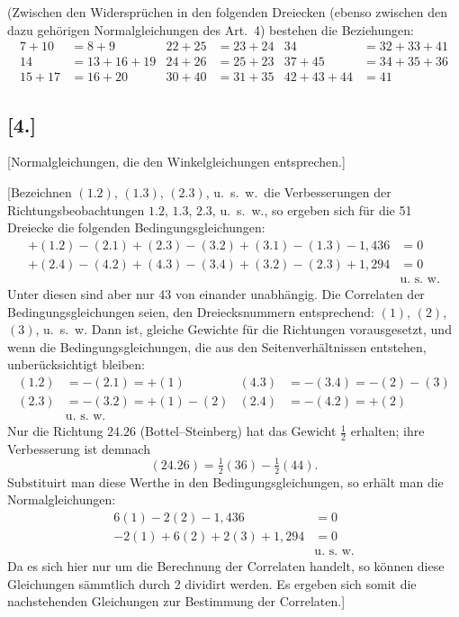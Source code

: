 \documentclass[12pt,a4paper]{article}
\theoremstyle{plain}
\theoremstyle{definition}
\theoremstyle{remark}
\begin{document}
(Zwischen den Widerspr\"uchen in den folgenden Dreiecken (ebenso zwischen den dazu geh\"origen Normalgleichungen des Art.\ 4) bestehen die Beziehungen:
\begin{align*}
7 + 10 &= 8 + 9 & 22 + 25 &= 23 + 24 & 34 &= 32 + 33 + 41\\
14 &= 13 + 16 + 19 & 24 + 26 &= 25 + 23 & 37 + 45 &= 34 + 35 + 36\\
15 + 17 &= 16 + 20 & 30 + 40 &= 31 + 35 & 42 + 43 + 44 &= 41
\end{align*}
\newpage
\subsection*{[4.]}
\label{subsec:netz4}

[Normalgleichungen, die den Winkelgleichungen entsprechen.]

[Bezeichnen $(1.2)$, $(1.3)$, $(2.3)$, u.\ s.\ w.\ die Verbesserungen der Richtungsbeobachtungen $1.2$, $1.3$, $2.3$, u.\ s.\ w., so ergeben sich f\"ur die 51 Dreiecke die folgenden Bedingungsgleichungen:
\begin{align*}
+(1.2) - (2.1) + (2.3) - (3.2) + (3.1) - (1.3) - 1{,}436 &= 0\\
+(2.4) - (4.2) + (4.3) - (3.4) + (3.2) - (2.3) + 1{,}294 &= 0\\
&\text{u.\ s.\ w.}
\end{align*}
Unter diesen sind aber nur 43 von einander unabh\"angig. Die Correlaten der Bedingungsgleichungen seien, den Dreiecksnummern entsprechend: $(1)$, $(2)$, $(3)$, u.\ s.\ w. Dann ist, gleiche Gewichte f\"ur die Richtungen vorausgesetzt, und wenn die Bedingungsgleichungen, die aus den Seitenverh\"altnissen entstehen, unber\"ucksichtigt bleiben:
\begin{align*}
(1.2) &= -(2.1) = +(1) & (4.3) &= -(3.4) = -(2) - (3)\\
(2.3) &= -(3.2) = +(1) - (2) & (2.4) &= -(4.2) = +(2)\\
&\text{u.\ s.\ w.}
\end{align*}
Nur die Richtung $24.26$ (Bottel--Steinberg) hat das Gewicht $\frac{1}{2}$ erhalten; ihre Verbesserung ist demnach
\[(24.26) = \tfrac{1}{2}(36) - \tfrac{1}{2}(44).\]
Substituirt man diese Werthe in den Bedingungsgleichungen, so erh\"alt man die Normalgleichungen:
\begin{align*}
6(1) - 2(2) - 1{,}436 &= 0\\
-2(1) + 6(2) + 2(3) + 1{,}294 &= 0\\
&\text{u.\ s.\ w.}
\end{align*}
Da es sich hier nur um die Berechnung der Correlaten handelt, so k\"onnen diese Gleichungen s\"ammtlich durch 2 dividirt werden. Es ergeben sich somit die nachstehenden Gleichungen zur Bestimmung der Correlaten.]
\end{document}

